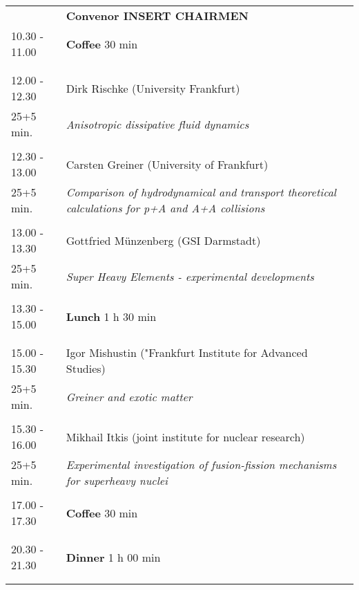 \begin{longtable}{p{3cm}p{13cm}}
&\hfill {\bf Convenor INSERT CHAIRMEN }\\ 
10.30 - 11.00 & {\bf Coffee} \hfill 30 min \\ 
 & \\ 
 & \\ 
12.00 - 12.30 & Dirk Rischke (University Frankfurt)\\ 
25+5 min. & {\it Anisotropic dissipative fluid dynamics}\\ 
 & \\ 
12.30 - 13.00 & Carsten Greiner (University of Frankfurt)\\ 
25+5 min. & {\it Comparison of hydrodynamical and transport theoretical calculations for p+A and A+A collisions}\\ 
 & \\ 
13.00 - 13.30 & Gottfried Münzenberg (GSI Darmstadt)\\ 
25+5 min. & {\it Super Heavy Elements -  experimental developments}\\ 
 & \\ 
13.30 - 15.00 & {\bf Lunch} \hfill 1 h 30 min \\ 
 & \\ 
 & \\ 
15.00 - 15.30 & Igor Mishustin ("Frankfurt Institute for Advanced Studies)\\ 
25+5 min. & {\it Greiner and exotic matter}\\ 
 & \\ 
15.30 - 16.00 & Mikhail Itkis (joint institute for nuclear research)\\ 
25+5 min. & {\it Experimental investigation of fusion-fission mechanisms for superheavy nuclei}\\ 
 & \\ 
17.00 - 17.30 & {\bf Coffee} \hfill 30 min \\ 
 & \\ 
 & \\ 
20.30 - 21.30 & {\bf Dinner} \hfill 1 h 00 min \\ 
 & \\ 
 & \\ 
\end{longtable}

